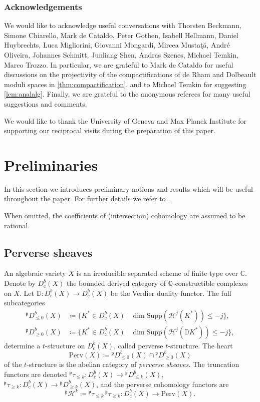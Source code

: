 \documentclass[JEP,XML,SOM,Unicode, NoEqCountersInSection,NoFloatCountersInSection,published]{cedram}
\let\mathcal\mathscr
\newcommand{\cc}{\mathrm{c}}
\newcommand{\pD}{{^{\mathfrak{p}}\!}D}
\newcommand{\pcH}{{^{\mathfrak{p}}\!\!}\mathcal{H}}
\theoremstyle{definition}
\newcommand{\CC}{\mathbb{C}}
\newcommand{\QQ}{\mathbb{Q}}
\begin{document}
\subsubsection*{Acknowledgements}
We would like to acknowledge useful conversations with Thorsten Beckmann, Simone Chiarello, Mark de Cataldo, Peter Gothen, Isabell Hellmann, Daniel Huybrechts, Luca Migliorini, Giovanni Mongardi, Mircea Mustaţă, André Oliveira, Johannes Schmitt, Junliang Shen, Andras Szenes, Michael Temkin, Marco Trozzo. In particular, we are grateful to Mark de Cataldo for useful discussions on the projectivity of the compactifications of de Rham and Dolbeault moduli spaces in \cref{thm:compactification}, and to Michael Temkin for suggesting \cref{lem:analalg}.
Finally, we are grateful to the anonymous referees for many useful suggestions and comments.

We would like to thank the University of Geneva and Max Planck Institute for supporting our reciprocal visits during the preparation of this paper.


\section{Preliminaries}\label{sec:preliminaries}
In this section we introduces preliminary notions and results which will be useful throughout the paper. For further details we refer to
\cite{BeilinsonBernsteinDeligne1981, GM80, GM81, deCataldoMigliorini05}.

When omitted, the coefficients of (intersection) cohomology are assumed to be rational.

\subsection{Perverse sheaves}
An algebraic variety $X$ is an irreducible separated scheme of finite type over $\CC$. Denote by $D^b_{\cc}(X)$ the bounded derived category of $\QQ$-construc\-tible complexes on $X$. Let $\mathbb{D}\colon D^b_{\cc}(X)\to D^b_{\cc}(X)$ be the Verdier duality functor.
The full subcategories
\begin{align*}
\pD^b_{\leq 0}(X) &\coloneqq \bigl \lbrace K^*\in D^b_{\cc}(X) \mid \dim \mathrm{Supp}(\mathcal{H}^j(K^*))\leq -j \bigr \rbrace,\\
\pD^b_{\geq 0}(X) &\coloneqq\bigl \lbrace K^* \in D^b_{\cc}(X) \mid \dim \mathrm{Supp}(\mathcal{H}^j(\mathbb{D}K^*))\leq -j \bigr \rbrace,
\end{align*}
determine a $t$-structure on $D^b_{\cc}(X)$, called perverse $t$-structure. The heart
\[
\mathrm{Perv}(X) \coloneqq \pD^b_{\leq 0}(X)\cap \pD^b_{\geq 0}(X)
\]
of the $t$-structure is the abelian category of \emph{perverse sheaves}. The truncation functors are denoted ${^{\mathfrak{p}}}\tau_{\leq k}\colon D^b_{\cc}(X)\to \pD^b_{\leq k}(X)$, ${^{\mathfrak{p}}}\tau_{\geq k}\colon D^b_{\cc}(X)\to \pD^b_{\geq k}(X)$, and the perverse cohomology functors are
\[
\pcH^{k} \coloneqq {^{\mathfrak{p}}}\tau_{\leq k}\,{^{\mathfrak{p}}}\tau_{\geq k}\colon D^b_{\cc}(X) \to \mathrm{Perv}(X).
\]
\end{document}
